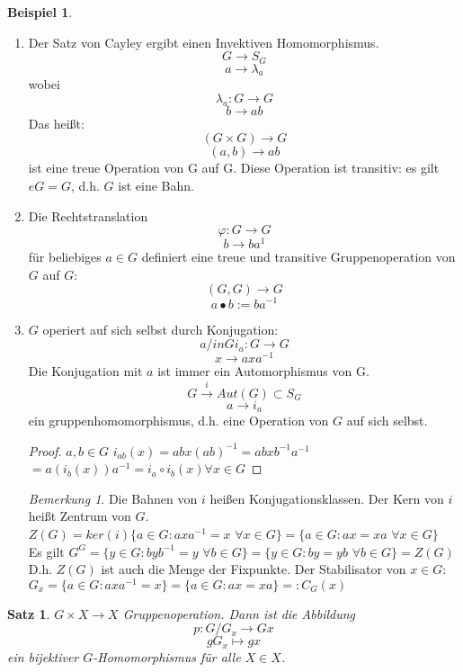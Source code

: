 \documentclass[12pt]{scrartcl}%
\newtheorem{thm}{Satz}
\theoremstyle{definition}
\newtheorem{ex}{Beispiel}
\theoremstyle{remark}
\newtheorem*{nb}{Bemerkung}
\begin{document}
	\begin{ex}
	\begin{enumerate}
		\item Der Satz von Cayley ergibt einen Invektiven Homomorphismus.
		$$G \rightarrow S_G$$
		$$a \rightarrow \lambda_a$$
		wobei
		$$\lambda_a: G \rightarrow G$$
		$$b \rightarrow ab$$
		Das heißt: 
		$$(G\times G) \rightarrow G$$
		$$(a,b) \rightarrow ab$$
		ist eine treue Operation von G auf G.
		Diese Operation ist transitiv: es gilt $eG=G$, d.h. $G$ ist eine Bahn.
		
		\item Die Rechtstranslation
		$$\varphi : G \rightarrow G$$
		$$b \rightarrow ba^{1}$$
		für beliebiges $a\in G$ definiert eine treue und transitive Gruppenoperation von $G$ auf $G$:
		$$(G,G) \rightarrow G$$
		$$a \bullet b := ba^{-1}$$	
		
		\item $G$ operiert auf sich selbst durch Konjugation:
		$$a /in G i_a : G \rightarrow G$$
		$$x \rightarrow axa^{-1}$$	
		Die Konjugation mit $a$ ist immer ein Automorphismus von G.
		$$G \xrightarrow{i} Aut(G) \subset S_G$$
		$$a \rightarrow i_a$$
		ein gruppenhomomorphismus, d.h. eine Operation von $G$ auf sich selbst.
		\begin{proof}
		$a,b \in G$ $i_{ab}(x)=abx(ab)^{-1}=abxb^{-1}a^{-1}$\\
		$=a(i_b(x))a^{-1}=i_a\circ i_b(x) \forall x\in G$
		\end{proof}
		\begin{nb}
		Die Bahnen von $i$ heißen Konjugationsklassen. Der Kern von $i$ heißt Zentrum von $G$.\\
		$Z(G)=ker(i)\{ a \in G : axa^{-1}=x$ $\forall x \in G\} = \{a \in G : ax =xa$ $\forall x \in G\}$\\
		Es gilt $G^G=\{ y \in G : byb^{-1}=y$ $\forall b \in G\}=\{ y \in G : by =yb$ $\forall b \in G\}=Z(G)$\\
		
		D.h. $Z(G)$ ist auch die Menge der Fixpunkte. Der Stabilisator von $x \in G$:\\
		$G_x=\{a \in G : axa^{-1}=x\}=\{ a \in G : ax = xa\}=:C_G(x)$
		\end{nb}		
	\end{enumerate}
	\end{ex}
	
	\begin{thm}
	$G \times X \rightarrow X$ Gruppenoperation. Dann ist die Abbildung
	$$p: G/G_x \to Gx$$
	$$gG_x \mapsto gx$$
	ein bijektiver $G$-Homomorphismus für alle $X \in X$.
	\end{thm}
	
\end{document}
